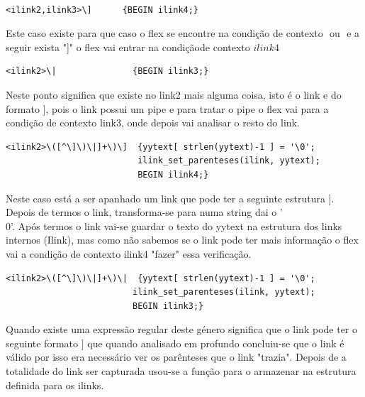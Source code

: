 \documentclass[11pt, a4paper, oneside]{article}
\begin{document}
\begin{verbatim}

<ilink2,ilink3>\]      {BEGIN ilink4;}
\end{verbatim}
Este caso existe para que caso o flex se encontre na condição de contexto \begin{math}<ilink2>\end{math} ou \begin{math}<ilink3>\end{math} e a seguir exista "]" o flex vai entrar na condiçãode contexto \begin{math}ilink4\end{math}




\begin{verbatim}
<ilink2>\|               {BEGIN ilink3;}
\end{verbatim}


Neste ponto significa que existe no link2 mais alguma coisa, isto é o link e do formato \begin{math}[[Crystallite|grain boundaries]]\end{math}, pois o link possui um pipe e para tratar o pipe o flex vai para a condição de contexto link3, onde depois vai analisar o resto do link. 


\begin{verbatim}
<ilink2>\([^\]\)\|]+\)\]  {yytext[ strlen(yytext)-1 ] = '\0';
                          ilink_set_parenteses(ilink, yytext);
                          BEGIN ilink4;}

\end{verbatim}

Neste caso está a ser apanhado um link que pode ter a seguinte estrutura \begin{math}[[Opacity (optics)]]\end{math}. Depois de termos o link,  transforma-se para numa string dai o '\\0'.
Após termos o link vai-se guardar o texto do yytext na estrutura dos links internos (Ilink), mas como não sabemos se o link pode ter mais informação o flex vai a condição de contexto ilink4 "fazer" essa verificação. 

\begin{verbatim}
<ilink2>\([^\]\)\|]+\)\|  {yytext[ strlen(yytext)-1 ] = '\0';
                         ilink_set_parenteses(ilink, yytext);
                         BEGIN ilink3;}
\end{verbatim}
Quando existe uma expressão regular deste género significa que o link pode ter o seguinte formato \begin{math}[[Opacity ((optics))|]]\end{math} que quando analisado em profundo concluiu-se que o link é válido por isso era necessário ver os parênteses que o link "trazia".
Depois de a totalidade do link ser capturada usou-se a função para o armazenar na estrutura definida para os ilinks.
\end{document}
